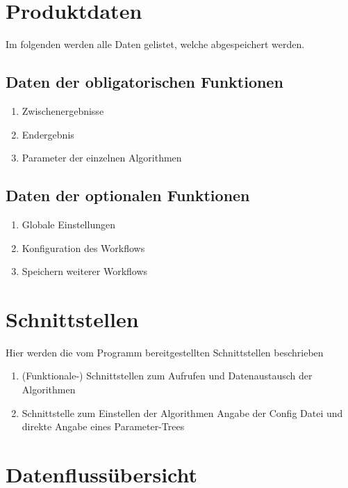 \section{Produktdaten}
Im folgenden werden alle Daten gelistet, welche abgespeichert werden.
\subsection{Daten der obligatorischen Funktionen}
\begin{enumerate}[align=left,leftmargin=4em, label={\textbf{\textbackslash PD10\arabic*0\textbackslash}} ]
	\item Zwischenergebnisse
	\item Endergebnis
	\item Parameter der einzelnen Algorithmen
\end{enumerate}
\subsection{Daten der optionalen Funktionen}
\begin{enumerate}[align=left,leftmargin=4em, label={\textbf{\textbackslash PD20\arabic*0\textbackslash}} ]
	\item Globale Einstellungen
	\item Konfiguration des Workflows
	\item Speichern weiterer Workflows
\end{enumerate}	

\section{Schnittstellen}
Hier werden die vom Programm bereitgestellten Schnittstellen beschrieben
\begin{enumerate}[ align=left, label={\textbf{\textbackslash S1\arabic*0\textbackslash}}]
\item (Funktionale-) Schnittstellen zum Aufrufen und Datenaustausch der Algorithmen
\item  Schnittstelle zum Einstellen der Algorithmen
Angabe der Config Datei und direkte Angabe eines Parameter-Trees
\end{enumerate}
\newpage 
\section{Datenflussübersicht}

